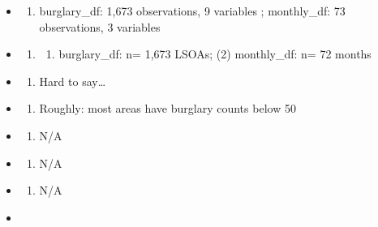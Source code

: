 \documentclass[
]{book}
\providecommand{\tightlist}{%
  \setlength{\itemsep}{0pt}\setlength{\parskip}{0pt}}
\begin{document}
\begin{itemize}
\item
  \begin{enumerate}
  \def\labelenumi{\arabic{enumi}.}
  \tightlist
  \item
    burglary\_df: 1,673 observations, 9 variables ; monthly\_df: 73 observations, 3 variables
  \end{enumerate}
\item
  \begin{enumerate}
  \def\labelenumi{\arabic{enumi}.}
  \setcounter{enumi}{1}
  \item
    \begin{enumerate}
    \def\labelenumii{(\arabic{enumii})}
    \tightlist
    \item
      burglary\_df: n= 1,673 LSOAs; (2) monthly\_df: n= 72 months
    \end{enumerate}
  \end{enumerate}
\item
  \begin{enumerate}
  \def\labelenumi{\arabic{enumi}.}
  \setcounter{enumi}{2}
  \tightlist
  \item
    Hard to say\ldots{}
  \end{enumerate}
\item
  \begin{enumerate}
  \def\labelenumi{\arabic{enumi}.}
  \setcounter{enumi}{3}
  \tightlist
  \item
    Roughly: most areas have burglary counts below 50
  \end{enumerate}
\item
  \begin{enumerate}
  \def\labelenumi{\arabic{enumi}.}
  \setcounter{enumi}{4}
  \tightlist
  \item
    N/A
  \end{enumerate}
\item
  \begin{enumerate}
  \def\labelenumi{\arabic{enumi}.}
  \setcounter{enumi}{5}
  \tightlist
  \item
    N/A
  \end{enumerate}
\item
  \begin{enumerate}
  \def\labelenumi{\arabic{enumi}.}
  \setcounter{enumi}{6}
  \tightlist
  \item
    N/A
  \end{enumerate}
\item
  \begin{enumerate}

\end{enumerate}
\end{itemize}
\end{document}

